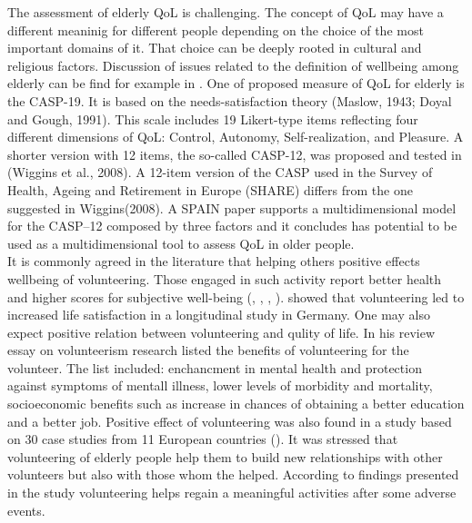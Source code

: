 \documentclass[10pt, letterpaper]{article}
\begin{document}
\begin{spacing}{1.4}
The assessment of elderly QoL is challenging. The concept of QoL may have a different meaninig for different people depending on the choice of the most important domains of it. That choice can be deeply rooted in cultural and religious factors. Discussion of issues related to the definition of wellbeing among elderly can be find for example in \citet{nrc2001}.  One of proposed measure of QoL for elderly is the CASP-19. It is based on the needs-satisfaction theory (Maslow, 1943; Doyal and Gough, 1991). This scale includes 19 Likert-type items reflecting four different dimensions of QoL: Control, Autonomy, Self-realization, and Pleasure. A shorter version with 12 items, the so-called CASP-12, was proposed and tested in (Wiggins et al., 2008). A 12-item version of the CASP used in the Survey of Health, Ageing and Retirement in Europe (SHARE) differs from the one suggested in Wiggins(2008). A SPAIN paper supports a multidimensional model for the CASP–12 composed by three factors and it concludes has potential to be used as a multidimensional tool to assess QoL in older people. \\

It is commonly agreed in the literature that helping others positive effects wellbeing of volunteering. Those engaged in such activity report better health and higher scores for subjective well-being (\citet{haski09}, \citet{morrow2003}, \citep{thoits03}, \citep{whillans2016}). \citep{meier08} showed that volunteering led to increased life satisfaction in a longitudinal study in Germany. One may also expect positive relation between volunteering and qulity of life.  In his review essay on volunteerism research \citet{wilson12} listed the benefits of volunteering for the volunteer. The list included: enchancment in mental health and protection against symptoms of mentall illness, lower levels of morbidity and mortality, socioeconomic benefits such as increase in chances of obtaining a better education and a better job. Positive effect of volunteering was also found in a study based on 30 case studies from 11 European countries (\citet{ehlers11}). It was stressed that volunteering of elderly people help them to build new relationships with other volunteers but also with those whom the helped. According to findings presented in the study volunteering helps regain a meaningful activities after some adverse events.   \\


\end{spacing}
\end{document}
